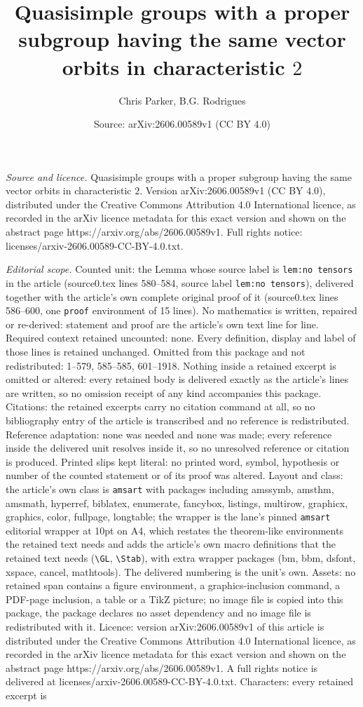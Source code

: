 \documentclass[10pt,a4paper]{amsart}
\title[Quasisimple groups with a proper subgroup having the same ve]{Quasisimple groups with a proper subgroup having the same vector orbits in characteristic $2$}
\author{Chris Parker, B.G. Rodrigues}
\date{Source: arXiv:2606.00589v1 (CC BY 4.0)}
\begin{document}
\maketitle

\noindent\emph{Source and licence.} Quasisimple groups with a proper subgroup having the same vector orbits in characteristic $2$. Version arXiv:2606.00589v1 (CC BY 4.0), distributed under the Creative Commons Attribution 4.0 International licence, as recorded in the arXiv licence metadata for this exact version and shown on the abstract page https://arxiv.org/abs/2606.00589v1. Full rights notice: licenses/arxiv-2606.00589-CC-BY-4.0.txt.\par\smallskip

\noindent\textit{Editorial scope.} Counted unit: the Lemma whose source label is \texttt{lem:no tensors} in the article (source0.tex lines 580--584, source label \texttt{lem:no tensors}), delivered together with the article's own complete original proof of it (source0.tex lines 586--600, one \texttt{proof} environment of 15 lines). No mathematics is written, repaired or re-derived: statement and proof are the article's own text line for line. Required context retained uncounted: none. Every definition, display and label of those lines is retained unchanged. Omitted from this package and not redistributed: 1--579, 585--585, 601--1918. Nothing inside a retained excerpt is omitted or altered: every retained body is delivered exactly as the article's lines are written, so no omission receipt of any kind accompanies this package. Citations: the retained excerpts carry no citation command at all, so no bibliography entry of the article is transcribed and no reference is redistributed. Reference adaptation: none was needed and none was made; every reference inside the delivered unit resolves inside it, so no unresolved reference or citation is produced. Printed slips kept literal: no printed word, symbol, hypothesis or number of the counted statement or of its proof was altered. Layout and class: the article's own class is \texttt{amsart} with packages including amssymb, amsthm, amsmath, hyperref, biblatex, enumerate, fancybox, listings, multirow, graphicx, graphics, color, fullpage, longtable; the wrapper is the lane's pinned \texttt{amsart} editorial wrapper at 10pt on A4, which restates the theorem-like environments the retained text needs and adds the article's own macro definitions that the retained text needs (\texttt{\textbackslash GL}, \texttt{\textbackslash Stab}), with extra wrapper packages (bm, bbm, dsfont, xspace, cancel, mathtools). The delivered numbering is the unit's own. Assets: no retained span contains a figure environment, a graphics-inclusion command, a PDF-page inclusion, a table or a TikZ picture; no image file is copied into this package, the package declares no asset dependency and no image file is redistributed with it. Licence: version arXiv:2606.00589v1 of this article is distributed under the Creative Commons Attribution 4.0 International licence, as recorded in the arXiv licence metadata for this exact version and shown on the abstract page https://arxiv.org/abs/2606.00589v1. A full rights notice is delivered at licenses/arxiv-2606.00589-CC-BY-4.0.txt. Characters: every retained excerpt is 
\end{document}
